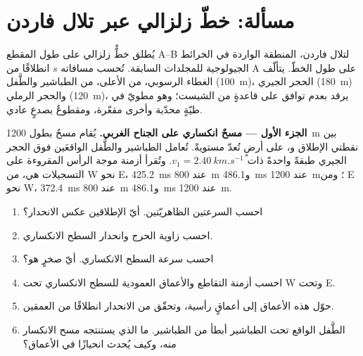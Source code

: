 \section{مسألة: خطّ زلزالي عبر تلال فاردن}

\begin{problem}
\label{pb:b3:exploration-seismology:1}
يُطلق خطٌّ زلزالي على طول المقطع A--B لتلال فاردن، المنطقة
الواردة في الخرائط الجيولوجية للمجلدات السابقة. تُحسب مسافاته $s$ انطلاقًا من
A على طول الخطّ. يتألّف الغطاء الرسوبي، من الأعلى، من الطباشير والطَّفل (\qty{100}{m})،
الحجر الجيري (\qty{180}{m}) والحجر الرملي (\qty{120}{m})، يرقد بعدم توافق على
قاعدةٍ من الشيست؛ وهو مطويّ في طيّةٍ محدّبة وأخرى مقعّرة، ومقطوعٌ بصدعٍ
عادي.

\medskip
\noindent\textbf{الجزء الأول --- مسحٌ انكساري على الجناح الغربي.} يُقام مسحٌ بطول
\qty{1200}{m} بين نقطتي الإطلاق 
و، على أرضٍ تُعدّ مستويةً. تُعامل الطباشير والطَّفل
الواقعَين فوق الحجر الجيري طبقةً واحدةً ذات $v_1 = \qty{2.40}{km.s^{-1}}$. وتُقرأ أزمنة
موجة الرأس المقروءة على التسجيلات هي، من W نحو E، \qty{425.2}{ms} عند
\qty{800}{m} و\qty{486.1}{ms} عند \qty{1200}{m}؛ ومن E نحو W،
\qty{372.4}{ms} عند \qty{800}{m} و\qty{486.1}{ms} عند \qty{1200}{m}.
\begin{enumerate}
  \item احسب السرعتين الظاهريّتين. أيّ الإطلاقين عكس الانحدار؟
  \item احسب زاوية الحرج وانحدار السطح الانكساري.
  \item احسب سرعة السطح الانكساري. أيّ صخرٍ هو؟
  \item احسب أزمنة التقاطع والأعماق العمودية للسطح
        الانكساري تحت W وتحت E.
  \item حوّل هذه الأعماق إلى أعماقٍ رأسية، وتحقّق من الانحدار انطلاقًا من العمقين.
  \item الطَّفل الواقع تحت الطباشير أبطأ من الطباشير. ما الذي يستنتجه
        مسح الانكسار منه، وكيف يُحدث انحيازًا في الأعماق؟
\end{enumerate}


\end{problem}
